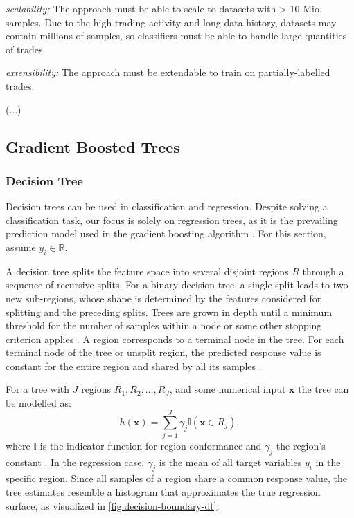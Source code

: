 \emph{scalability:}  The approach must be able to scale to datasets with > 10 Mio. samples. Due to the high trading activity and long data history, datasets may contain millions of samples, so classifiers must be able to handle large quantities of trades.

\emph{extensibility:} The approach must be extendable to train on partially-labelled trades.

(...)


\subsection{Gradient Boosted Trees}\label{sec:gradient-boosted-trees}

\subsubsection{Decision Tree}\label{sec:decision-tree}

Decision trees can be used in classification and regression. Despite solving a classification task, our focus is solely on regression trees, as it is the prevailing prediction model used in the gradient boosting algorithm \autocite[][9]{friedmanAdditiveLogisticRegression2000}. For this section, assume $y_i \in \mathbb{R}$.

A decision tree splits the feature space into several disjoint regions $R$ through a sequence of recursive splits. For a binary decision tree, a single split leads to two new sub-regions, whose shape is determined by the features considered for splitting and the preceding splits. Trees are grown in depth until a minimum threshold for the number of samples within a node or some other stopping criterion applies \autocite[][42]{breimanClassificationRegressionTrees2017}.
A region corresponds to a terminal node in the tree. For each terminal node of the tree or unsplit region, the predicted response value is constant for the entire region and shared by all its samples \autocite[][229]{breimanClassificationRegressionTrees2017}.

For a tree with $J$ regions $R_1, R_2,\ldots, R_J$, and some numerical input $\mathbf{x}$ the tree can be modelled as:
\begin{equation}
    h(\mathbf{x})=\sum_{j=1}^{J} \gamma_{j} \mathbb{I}\left(\mathbf{x} \in R_{j}\right),
    \label{eq:decision-tree}
\end{equation}
where $\mathbb{I}$ is the indicator function for region conformance and $\gamma_j$ the region's constant \autocite[][326]{hastietrevorElementsStatisticalLearning2009}. In the regression case, $\gamma_j$ is the mean of all target variables $y_i$ in the specific region. Since all samples of a region share a common response value, the tree estimates resemble a histogram that approximates the true regression surface, as visualized in \cref{fig:decision-boundary-dt}.

